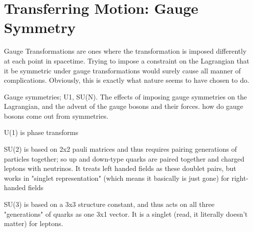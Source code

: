 

\section{Transferring Motion: Gauge Symmetry}
    Gauge Transformations are ones where the transformation is imposed differently at each point in spacetime.
    Trying to impose a constraint on the Lagrangian that it be symmetric under gauge transformations would surely cause all manner of complications.
    Obviously, this is exactly what nature seems to have chosen to do.

    Gauge symmetries; U1, SU(N).
    The effects of imposing gauge symmetries on the Lagrangian, and the advent of the gauge bosons and their forces.
    how do gauge bosons come out from symmetries.

    U(1) is phase transforms

    SU(2) is based on 2x2 pauli matrices and thus requires pairing generations of particles together;
        so up and down-type quarks are paired together and charged leptons with neutrinos.
    It treats left handed fields as these doublet pairs,
        but works in "singlet representation" (which means it basically is just gone) for right-handed fields

    SU(3) is based on a 3x3 structure constant, and thus acts on all three "generations" of quarks as one 3x1 vector.
    It is a singlet (read, it literally doesn't matter) for leptons.
    
    \cite{Osborn_notes}
    \cite{Peskin_book}
    \cite{Halzen_book}


